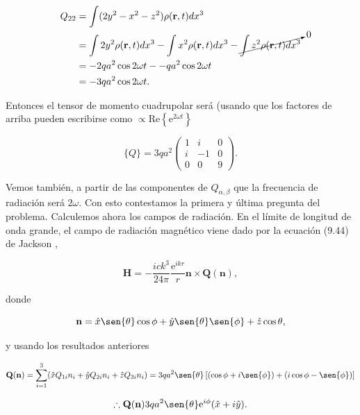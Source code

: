 \documentclass[a4paper,11pt]{article}
\numberwithin{equation}{section}
\newcommand{\euler}{\mathrm{e}}
\begin{document}
\begin{align*}
 Q_{22} &= \int (2y^2 - x^2 - z^2)\rho(\mathbf{r},t) dx^3 \\
 &= \int 2 y^2 \rho(\mathbf{r},t) dx^3 
 - \int x^2 \rho(\mathbf{r},t) dx^3 - \cancelto{0}{\int z^2\rho(\mathbf{r},t) dx^3} \\
 &= - 2 q a^2 \cos{2\omega t} - - q a^2 \cos{2\omega t}\\
 &= - 3 q a^2 \cos{2\omega t}.
\end{align*}

Entonces el tensor de momento cuadrupolar será (usando que los factores de arriba 
pueden escribirse como $\propto \text{Re}\left\{\euler^{2\omega t}\right\}$

\begin{equation}
 \{ Q \} = 3qa^2 \begin{pmatrix}
                  1 & i & 0 \\
                  i & -1 & 0 \\
                  0 & 0 & 9
                 \end{pmatrix}.
\end{equation}

Vemos también, a partir de las componentes de $Q_{\alpha,\beta}$ que 
la frecuencia de radiación será $2\omega$. Con esto contestamos la primera y 
última pregunta del problema. Calculemos ahora los campos de radiación. En el límite 
de longitud de onda grande, el campo de radiación magnético viene dado por la 
ecuación (9.44) de Jackson \cite{jackson}, 

\begin{equation}
 \mathbf{H} = - \frac{ick^3}{24\pi}\frac{\euler^{ikr}}{r} \mathbf{n} \times 
 \mathbf{Q}(\mathbf{n}), 
\end{equation}

donde 

\begin{equation}
 \mathbf{n} = \hat{x} \sen{\theta}\cos{\phi} + \hat{y} \sen{\theta}\sen{\phi} 
 + \hat{z} \cos{\theta},
\end{equation}

y usando los resultados anteriores

\begin{equation*}
 \mathbf{Q}(\mathbf{n}) = \sum_{i=1}^3 (\hat{x}Q_{1i} n_i + \hat{y}Q_{2i} n_i + 
 \hat{z}Q_{3i} n_i) = 3qa^2\sen{\theta}\left[(\cos{\phi} + i \sen{\phi}) 
 + (i\cos{\phi} - \sen{\phi})\right]
\end{equation*}

\begin{equation}
 \therefore \mathbf{Q}(\mathbf{n}) 3qa^2\sen{\theta} \euler^{i\phi}(\hat{x} + 
 i\hat{y}).
\end{equation}
\end{document}
